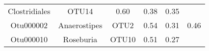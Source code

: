 \documentclass[12pt,]{article}
\begin{document}
\begin{longtable}[]{@{}cccccc@{}}
\begin{minipage}[t]{0.17\columnwidth}
Clostridiales\strut
\end{minipage} & \begin{minipage}[t]{0.15\columnwidth}\centering\strut
OTU14\strut
\end{minipage} & \begin{minipage}[t]{0.22\columnwidth}\centering\strut
0.60\strut
\end{minipage} & \begin{minipage}[t]{0.17\columnwidth}\centering\strut
0.38\strut
\end{minipage} & \begin{minipage}[t]{0.04\columnwidth}\centering\strut
0.35\strut
\end{minipage}\tabularnewline
\begin{minipage}[t]{0.08\columnwidth}\centering\strut
Otu000002\strut
\end{minipage} & \begin{minipage}[t]{0.17\columnwidth}\centering\strut
Anaerostipes\strut
\end{minipage} & \begin{minipage}[t]{0.15\columnwidth}\centering\strut
OTU2\strut
\end{minipage} & \begin{minipage}[t]{0.22\columnwidth}\centering\strut
0.54\strut
\end{minipage} & \begin{minipage}[t]{0.17\columnwidth}\centering\strut
0.31\strut
\end{minipage} & \begin{minipage}[t]{0.04\columnwidth}\centering\strut
0.46\strut
\end{minipage}\tabularnewline
\begin{minipage}[t]{0.08\columnwidth}\centering\strut
Otu000010\strut
\end{minipage} & \begin{minipage}[t]{0.17\columnwidth}\centering\strut
Roseburia\strut
\end{minipage} & \begin{minipage}[t]{0.15\columnwidth}\centering\strut
OTU10\strut
\end{minipage} & \begin{minipage}[t]{0.22\columnwidth}\centering\strut
0.51\strut
\end{minipage} & \begin{minipage}[t]{0.17\columnwidth}\centering\strut
0.27\strut
\end{minipage} & \begin{minipage}[t]{0.04\columnwidth}\centering\strut

\end{minipage}
\end{longtable}
\end{document}
